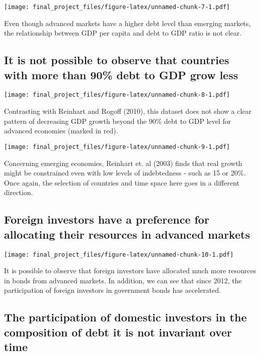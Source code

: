 \documentclass[]{article}
\begin{document}
\texttt{[image: final\_project\_files/figure-latex/unnamed-chunk-7-1.pdf]}

Even though advanced markets have a higher debt level than emerging
markets, the relationship between GDP per capita and debt to GDP ratio
is not clear.

\subsection{It is not possible to observe that countries with more than
90\% debt to GDP grow
less}\label{it-is-not-possible-to-observe-that-countries-with-more-than-90-debt-to-gdp-grow-less}

\texttt{[image: final\_project\_files/figure-latex/unnamed-chunk-8-1.pdf]}

Contrasting with Reinhart and Rogoff (2010), this dataset does not show
a clear pattern of decreasing GDP growth beyond the 90\% debt to GDP
level for advanced economies (marked in red).

\texttt{[image: final\_project\_files/figure-latex/unnamed-chunk-9-1.pdf]}

Concerning emerging economies, Reinhart et. al (2003) finds that real
growth might be constrained even with low levels of indebtedness - such
as 15 or 20\%. Once again, the selection of countries and time space
here goes in a different direction.

\subsection{Foreign investors have a preference for allocating their
resources in advanced
markets}\label{foreign-investors-have-a-preference-for-allocating-their-resources-in-advanced-markets}

\texttt{[image: final\_project\_files/figure-latex/unnamed-chunk-10-1.pdf]}

It is possible to observe that foreign investors have allocated much
more resources in bonds from advanced markets. In addition, we can see
that since 2012, the participation of foreign investors in government
bonds has accelerated.

\subsection{The participation of domestic investors in the composition
of debt it is not invariant over
time}\label{the-participation-of-domestic-investors-in-the-composition-of-debt-it-is-not-invariant-over-time}
\end{document}
